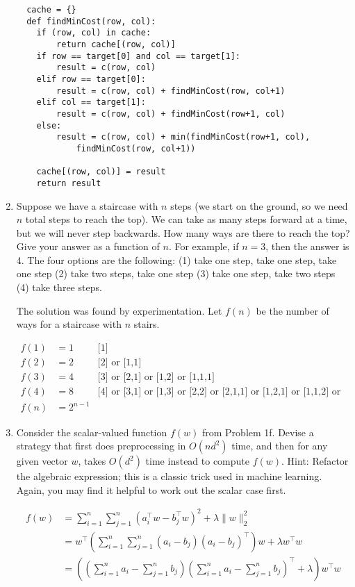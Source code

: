 \documentclass[10pt]{article}
\begin{document}
\begin{enumerate}[label=(\alph*)]
  \begin{lstlisting}
  cache = {}
  def findMinCost(row, col):
  	if (row, col) in cache:
  		return cache[(row, col)]
  	if row == target[0] and col == target[1]:
  		result = c(row, col)
  	elif row == target[0]:
  		result = c(row, col) + findMinCost(row, col+1)
  	elif col == target[1]:
  		result = c(row, col) + findMinCost(row+1, col)
  	else:
  		result = c(row, col) + min(findMinCost(row+1, col),
  			findMinCost(row, col+1))
  		
  	cache[(row, col)] = result
  	return result
  \end{lstlisting}
  
  \item Suppose we have a staircase with $n$ steps (we start on the ground, so we need $n$ total steps to reach the top). We can take as many steps forward at a time, but we will never step backwards. How many ways are there to reach the top? Give your answer as a function of $n$. For example, if $n=3$, then the answer is 4. The four options are the following: (1) take one step, take one step, take one step (2) take two steps, take one step (3) take one step, take two steps (4) take three steps.
  
  The solution was found by experimentation. Let $f(n)$ be the number of ways for a staircase with $n$ stairs.
  
  \begin{align*}
  f(1) &= 1 &\text{[1]}\\
  f(2) &= 2 &\text{[2] or [1,1]}\\
  f(3) &= 4 &\text{[3] or [2,1] or [1,2] or [1,1,1]}\\
  f(4) &= 8 &\text{[4] or [3,1] or [1,3] or [2,2] or [2,1,1] or [1,2,1] or [1,1,2] or [1,1,1,1]}\\
  f(n) &= 2^{n-1}
  \end{align*}
  
  \item Consider the scalar-valued function $f(w)$ from Problem 1f. Devise a strategy that first does preprocessing in $O(nd^2)$ time, and then for any given vector $w$, takes $O(d^2)$ time instead to compute $f(w)$.
Hint: Refactor the algebraic expression; this is a classic trick used in machine learning. Again, you may find it helpful to work out the scalar case first.

  \begin{align*}
  f(w) &= \sum_{i=1}^n \sum_{j=1}^n (a_i^\top w - b_j^\top w)^2 + \lambda \lVert w \rVert_2^2\\
  &= w^{\top} \left( \sum_{i = 1}^n \sum_{j = 1}^n (a_i - b_j)(a_i - b_j)^{\top} \right) w + \lambda w^{\top}w\\
  &= \left( \left(\sum_{i = 1}^n a_i - \sum_{j = 1}^n b_j\right)\left(\sum_{i = 1}^n a_i - \sum_{j = 1}^n b_j\right)^{\top} + \lambda \right) w^{\top}w
  \end{align*}

\end{enumerate}
\end{document}
